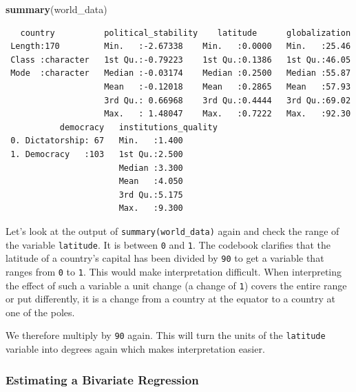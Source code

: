 \documentclass[]{article}
\newenvironment{Shaded}{\begin{snugshade}}{\end{snugshade}}
\newcommand{\KeywordTok}[1]{\textcolor[rgb]{0.13,0.29,0.53}{\textbf{#1}}}
\newcommand{\DecValTok}[1]{\textcolor[rgb]{0.00,0.00,0.81}{#1}}
\newcommand{\StringTok}[1]{\textcolor[rgb]{0.31,0.60,0.02}{#1}}
\newcommand{\CommentTok}[1]{\textcolor[rgb]{0.56,0.35,0.01}{\textit{#1}}}
\newcommand{\OperatorTok}[1]{\textcolor[rgb]{0.81,0.36,0.00}{\textbf{#1}}}
\newcommand{\NormalTok}[1]{#1}
\theoremstyle{definition}
\theoremstyle{definition}
\theoremstyle{definition}
\theoremstyle{remark}
\begin{document}
\begin{Shaded}
\begin{Highlighting}[]
\KeywordTok{summary}\NormalTok{(world_data)}
\end{Highlighting}
\end{Shaded}

\begin{verbatim}
   country          political_stability    latitude      globalization  
 Length:170         Min.   :-2.67338    Min.   :0.0000   Min.   :25.46  
 Class :character   1st Qu.:-0.79223    1st Qu.:0.1386   1st Qu.:46.05  
 Mode  :character   Median :-0.03174    Median :0.2500   Median :55.87  
                    Mean   :-0.12018    Mean   :0.2865   Mean   :57.93  
                    3rd Qu.: 0.66968    3rd Qu.:0.4444   3rd Qu.:69.02  
                    Max.   : 1.48047    Max.   :0.7222   Max.   :92.30  
           democracy   institutions_quality
 0. Dictatorship: 67   Min.   :1.400       
 1. Democracy   :103   1st Qu.:2.500       
                       Median :3.300       
                       Mean   :4.050       
                       3rd Qu.:5.175       
                       Max.   :9.300       
\end{verbatim}

Let's look at the output of \texttt{summary(world\_data)} again and
check the range of the variable \texttt{latitude}. It is between
\texttt{0} and \texttt{1}. The codebook clarifies that the latitude of a
country's capital has been divided by \texttt{90} to get a variable that
ranges from \texttt{0} to \texttt{1}. This would make interpretation
difficult. When interpreting the effect of such a variable a unit change
(a change of \texttt{1}) covers the entire range or put differently, it
is a change from a country at the equator to a country at one of the
poles.

We therefore multiply by \texttt{90} again. This will turn the units of
the \texttt{latitude} variable into degrees again which makes
interpretation easier.

\begin{Shaded}
\end{Shaded}

\subsubsection{Estimating a Bivariate
Regression}\label{estimating-a-bivariate-regression}
\end{document}
